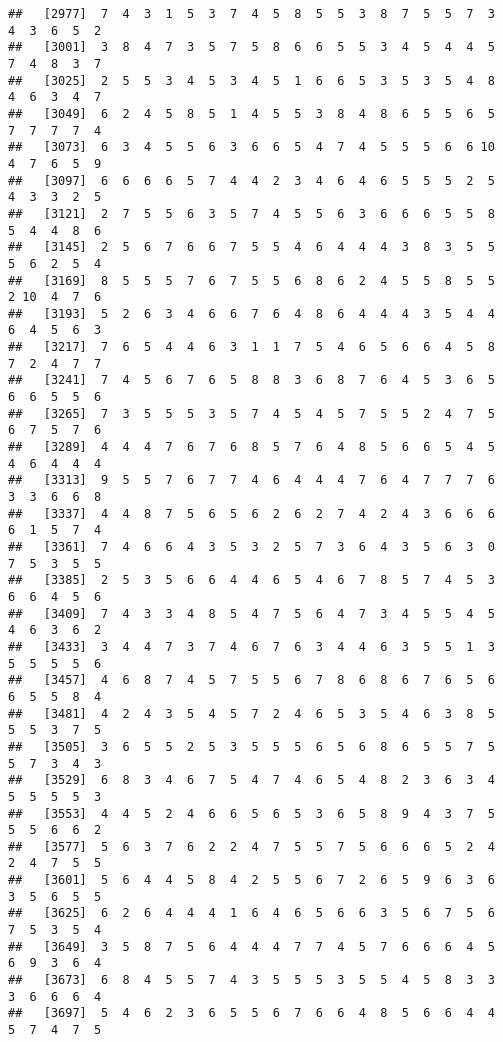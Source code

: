 \documentclass[
]{book}
\begin{document}
\begin{verbatim}
##   [2977]  7  4  3  1  5  3  7  4  5  8  5  5  3  8  7  5  5  7  3  4  3  6  5  2
##   [3001]  3  8  4  7  3  5  7  5  8  6  6  5  5  3  4  5  4  4  5  7  4  8  3  7
##   [3025]  2  5  5  3  4  5  3  4  5  1  6  6  5  3  5  3  5  4  8  4  6  3  4  7
##   [3049]  6  2  4  5  8  5  1  4  5  5  3  8  4  8  6  5  5  6  5  7  7  7  7  4
##   [3073]  6  3  4  5  5  6  3  6  6  5  4  7  4  5  5  5  6  6 10  4  7  6  5  9
##   [3097]  6  6  6  6  5  7  4  4  2  3  4  6  4  6  5  5  5  2  5  4  3  3  2  5
##   [3121]  2  7  5  5  6  3  5  7  4  5  5  6  3  6  6  6  5  5  8  5  4  4  8  6
##   [3145]  2  5  6  7  6  6  7  5  5  4  6  4  4  4  3  8  3  5  5  5  6  2  5  4
##   [3169]  8  5  5  5  7  6  7  5  5  6  8  6  2  4  5  5  8  5  5  2 10  4  7  6
##   [3193]  5  2  6  3  4  6  6  7  6  4  8  6  4  4  4  3  5  4  4  6  4  5  6  3
##   [3217]  7  6  5  4  4  6  3  1  1  7  5  4  6  5  6  6  4  5  8  7  2  4  7  7
##   [3241]  7  4  5  6  7  6  5  8  8  3  6  8  7  6  4  5  3  6  5  6  6  5  5  6
##   [3265]  7  3  5  5  5  3  5  7  4  5  4  5  7  5  5  2  4  7  5  6  7  5  7  6
##   [3289]  4  4  4  7  6  7  6  8  5  7  6  4  8  5  6  6  5  4  5  4  6  4  4  4
##   [3313]  9  5  5  7  6  7  7  4  6  4  4  4  7  6  4  7  7  7  6  3  3  6  6  8
##   [3337]  4  4  8  7  5  6  5  6  2  6  2  7  4  2  4  3  6  6  6  6  1  5  7  4
##   [3361]  7  4  6  6  4  3  5  3  2  5  7  3  6  4  3  5  6  3  0  7  5  3  5  5
##   [3385]  2  5  3  5  6  6  4  4  6  5  4  6  7  8  5  7  4  5  3  6  6  4  5  6
##   [3409]  7  4  3  3  4  8  5  4  7  5  6  4  7  3  4  5  5  4  5  4  6  3  6  2
##   [3433]  3  4  4  7  3  7  4  6  7  6  3  4  4  6  3  5  5  1  3  5  5  5  5  6
##   [3457]  4  6  8  7  4  5  7  5  5  6  7  8  6  8  6  7  6  5  6  6  5  5  8  4
##   [3481]  4  2  4  3  5  4  5  7  2  4  6  5  3  5  4  6  3  8  5  5  5  3  7  5
##   [3505]  3  6  5  5  2  5  3  5  5  5  6  5  6  8  6  5  5  7  5  5  7  3  4  3
##   [3529]  6  8  3  4  6  7  5  4  7  4  6  5  4  8  2  3  6  3  4  5  5  5  5  3
##   [3553]  4  4  5  2  4  6  6  5  6  5  3  6  5  8  9  4  3  7  5  5  5  6  6  2
##   [3577]  5  6  3  7  6  2  2  4  7  5  5  7  5  6  6  6  5  2  4  2  4  7  5  5
##   [3601]  5  6  4  4  5  8  4  2  5  5  6  7  2  6  5  9  6  3  6  3  5  6  5  5
##   [3625]  6  2  6  4  4  4  1  6  4  6  5  6  6  3  5  6  7  5  6  7  5  3  5  4
##   [3649]  3  5  8  7  5  6  4  4  4  7  7  4  5  7  6  6  6  4  5  6  9  3  6  4
##   [3673]  6  8  4  5  5  7  4  3  5  5  5  3  5  5  4  5  8  3  3  3  6  6  6  4
##   [3697]  5  4  6  2  3  6  5  5  6  7  6  6  4  8  5  6  6  4  4  5  7  4  7  5

\end{verbatim}
\end{document}
